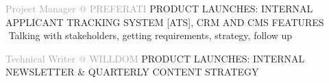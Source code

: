 \begin{cvtable}
% 
{\textcolor{darkgray}{%
Project Manager
\newline
@
{P\scriptsize REFERATI}
}}%
{
}%
{%
    {\scriptsize PRODUCT LAUNCHES:
    INTERNAL APPLICANT TRACKING SYSTEM [ATS], %
    CRM AND CMS FEATURES
    } \\
     \textperiodcentered $ $ Talking with stakeholders, %
     getting requirements, strategy, follow up \\  %
} 

{\textcolor{darkgray}{%
    Technical Writer \newline @
{W\scriptsize ILL}{D\scriptsize OM}
    }}%
{
}%
{%
{\scriptsize PRODUCT LAUNCHES:
INTERNAL NEWSLETTER \& QUARTERLY CONTENT STRATEGY
} \\
} 


\end{cvtable}
